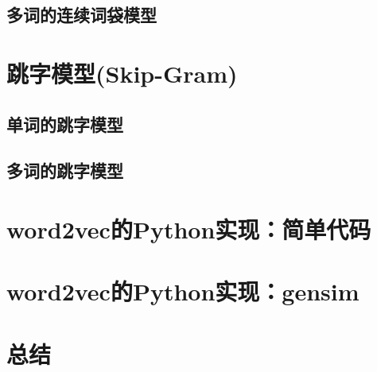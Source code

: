 \documentclass[UTF8, 12pt]{ctexart}
\begin{document}
	\subsection{多词的连续词袋模型}
	
\section{跳字模型(Skip-Gram)}
	
	\subsection{单词的跳字模型}
	
	\subsection{多词的跳字模型}

\section{word2vec的Python实现：简单代码}
	
\section{word2vec的Python实现：gensim}


\section{总结}

  
  
\end{document}
